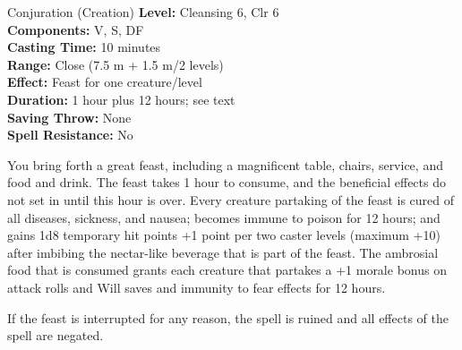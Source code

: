 {Conjuration (Creation)}
{
	\textbf{Level:}
	Cleansing 6, Clr 6\\
	\textbf{Components:}
	V, S, DF\\
	\textbf{Casting Time:}
	10 minutes\\
	\textbf{Range:}
	Close (7.5 m + 1.5 m/2 levels)\\
	\textbf{Effect:}
	Feast for one creature/level\\
	\textbf{Duration:}
	1 hour plus 12 hours; see text\\
	\textbf{Saving Throw:}
	None\\
	\textbf{Spell Resistance:}
	No\\
}
{
	You bring forth a great feast, including a magnificent table, chairs, service, and food and drink. The feast takes 1 hour to consume, and the beneficial effects do not set in until this hour is over. Every creature partaking of the feast is cured of all diseases, sickness, and nausea; becomes immune to poison for 12 hours; and gains 1d8 temporary hit points +1 point per two caster levels (maximum +10) after imbibing the nectar-like beverage that is part of the feast. The ambrosial food that is consumed grants each creature that partakes a +1 morale bonus on attack rolls and Will saves and immunity to fear effects for 12 hours.

	If the feast is interrupted for any reason, the spell is ruined and all effects of the spell are negated.

}
